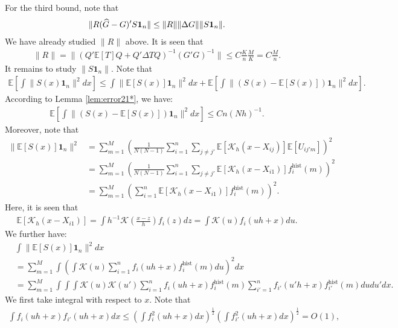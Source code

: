 \documentclass[preprint,11pt]{article}
\newcommand{\mbb}{\mathbb}
\newcommand{\mbf}{\mathbf}
\newcommand{\mcal}{\mathcal}
\numberwithin{equation}{section}
\begin{document}
For the third bound, note that
\begin{align*}
    \|R(\widehat{G}-G)'S{\bf 1}_n\|\le \|R\|\|\Delta G\|\|S\mbf{1}_n\|.
\end{align*}
We have already studied $\|R\|$ above. It is seen that
\begin{align*}
    \|R\|=\|(Q'\mbb{E}[T]Q+Q'\Delta T Q)^{-1}(G'G)^{-1}\|\le C\frac{K}{n}\frac{M}{K}=C\frac{M}{n}.
\end{align*}
It remains to study $\|S\mbf{1}_n\|$. Note that
\begin{align*}
    \mbb{E}\left[\int \|S(x)\mbf{1}_n\|^2dx\right]\le \int \|\mbb{E}[S(x)]\mbf{1}_n\|^2dx+\mbb{E}\left[\int \|(S(x)-\mbb{E}[S(x)])\mbf{1}_n\|^2dx\right].
\end{align*}
According to Lemma \ref{lem:error21*}, we have:
\begin{align*}
    \mbb{E}\left[\int \|(S(x)-\mbb{E}[S(x)])\mbf{1}_n\|^2dx\right]\le Cn(Nh)^{-1}.
\end{align*}
Moreover, note that
\begin{align*}
    \|\mbb{E}[S(x)]\mbf{1}_n\|^2&=\sum_{m=1}^M \left(\frac{1}{N(N-1)}\sum_{i=1}^n \sum_{j\neq j'}\mbb{E}[\mcal{K}_h(x-X_{ij})]\mbb{E}[U_{ij'm}]\right)^2\\
    &=\sum_{m=1}^M \left(\frac{1}{N(N-1)}\sum_{i=1}^n \sum_{j\neq j'}\mbb{E}[\mcal{K}_h(x-X_{i1})]f_i^{\text{hist}}(m)\right)^2\\
    &=\sum_{m=1}^M\left(\sum_{i=1}^n \mbb{E}[\mcal{K}_h(x-X_{i1})]f_i^{\text{hist}}(m)\right)^2.
\end{align*}
Here, it is seen that
\begin{align*}
    \mbb{E}[\mcal{K}_h(x-X_{i1})]=\int h^{-1}\mcal{K}\left(\frac{x-z}{h}\right)f_i(z)dz=\int \mcal{K}(u)f_i(uh+x)du.
\end{align*}
We further have:
\begin{align*}
    &\int \|\mbb{E}[S(x)]\mbf{1}_n\|^2dx\\&= \sum_{m=1}^M\int \left(\int \mcal{K}(u)\sum_{i=1}^nf_i(uh+x)f_i^{\text{hist}}(m)du\right)^2dx\\
    &= \sum_{m=1}^M\int \int \int\mcal{K}(u)\mcal{K}(u')\sum_{i=1}^nf_i(uh+x)f_i^{\text{hist}}(m) \sum_{i'=1}^nf_{i'}(u'h+x)f_{i'}^{\text{hist}}(m)dudu'dx.
\end{align*}
We first take integral with respect to $x$. Note that
\begin{align*}
    \int f_i(uh+x)f_{i'}(uh+x)dx\le \left(\int f_i^2(uh+x)dx\right)^{\frac{1}{2}}\left(\int f_{i'}^2(uh+x)dx\right)^{\frac{1}{2}}=O(1),
\end{align*}
\end{document}
